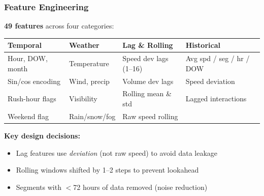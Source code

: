 \documentclass{beamer}
\begin{document}
\begin{frame}
\frametitle{Feature Engineering}

\textbf{49 features} across four categories:

\bigskip
{\small
\begin{tabular}{@{}llll@{}}
\toprule
\textbf{Temporal} & \textbf{Weather} & \textbf{Lag \& Rolling} & \textbf{Historical} \\
\midrule
Hour, DOW, month   & Temperature   & Speed dev lags (1--16) & Avg spd / seg / hr / DOW \\
Sin/cos encoding   & Wind, precip  & Volume dev lags        & Speed deviation          \\
Rush-hour flags    & Visibility    & Rolling mean \& std    & Lagged interactions      \\
Weekend flag       & Rain/snow/fog & Raw speed rolling      &                          \\
\bottomrule
\end{tabular}
}

\bigskip
\textbf{Key design decisions:}
\begin{itemize}\setlength\itemsep{3pt}
  \item Lag features use \emph{deviation} (not raw speed) to avoid data leakage
  \item Rolling windows shifted by 1--2 steps to prevent lookahead
  \item Segments with $<$72 hours of data removed (noise reduction)
\end{itemize}
\end{frame}
\end{document}
